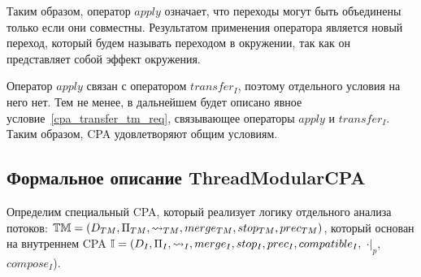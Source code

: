 Таким образом, оператор $apply$ означает, что переходы могут быть объединены только если они совместны. Результатом применения оператора является новый переход, который будем называть переходом в окружении, так как он представляет собой эффект окружения.

Оператор $apply$ связан с оператором $transfer_I$, поэтому отдельного условия на него нет.
Тем не менее, в дальнейшем будет описано явное условие~\ref{cpa_transfer_tm_req}, связывающее операторы $apply$ и $transfer_I$.
Таким образом, CPA удовлетворяют общим условиям.


\subsection{Формальное описание ThreadModularCPA}

Определим специальный CPA, который реализует логику отдельного анализа потоков: $\mathbb{TM}=(D_{TM}, \Pi_{TM}, \leadsto_{TM}, merge_{TM}, stop_{TM}, prec_{TM})$, который основан на внутреннем CPA $\mathbb{I}=(D_{I}, \Pi_{I}, \leadsto_{I}, merge_{I}, stop_{I}, prec_{I}, compatible_{I},$ $\cdot|_p,$ $compose_I$).

